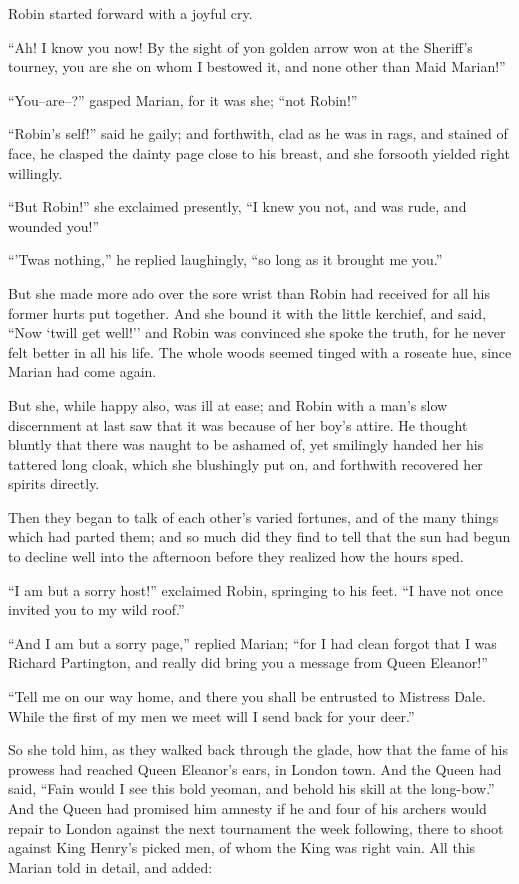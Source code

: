 Robin started forward with a joyful cry.

``Ah! I know you now! By the sight of yon golden arrow won at the
Sheriff's tourney, you are she on whom I bestowed it, and none other
than Maid Marian!''

``You--are--?'' gasped Marian, for it was she; ``not Robin!''

``Robin's self!'' said he gaily; and forthwith, clad as he was in rags,
and stained of face, he clasped the dainty page close to his breast, and
she forsooth yielded right willingly.

``But Robin!'' she exclaimed presently, ``I knew you not, and was rude,
and wounded you!''

``'Twas nothing,'' he replied laughingly, ``so long as it brought me
you.''

But she made more ado over the sore wrist than Robin had received for
all his former hurts put together. And she bound it with the little
kerchief, and said, ``Now `twill get well!'' and Robin was convinced she
spoke the truth, for he never felt better in all his life. The whole
woods seemed tinged with a roseate hue, since Marian had come again.

But she, while happy also, was ill at ease; and Robin with a man's slow
discernment at last saw that it was because of her boy's attire. He
thought bluntly that there was naught to be ashamed of, yet smilingly
handed her his tattered long cloak, which she blushingly put on, and
forthwith recovered her spirits directly.

Then they began to talk of each other's varied fortunes, and of the many
things which had parted them; and so much did they find to tell that the
sun had begun to decline well into the afternoon before they realized
how the hours sped.

``I am but a sorry host!'' exclaimed Robin, springing to his feet. ``I
have not once invited you to my wild roof.''

``And I am but a sorry page,'' replied Marian; ``for I had clean forgot
that I was Richard Partington, and really did bring you a message from
Queen Eleanor!''

``Tell me on our way home, and there you shall be entrusted to Mistress
Dale. While the first of my men we meet will I send back for your
deer.''

So she told him, as they walked back through the glade, how that the
fame of his prowess had reached Queen Eleanor's ears, in London town.
And the Queen had said, ``Fain would I see this bold yeoman, and behold
his skill at the long-bow.'' And the Queen had promised him amnesty if
he and four of his archers would repair to London against the next
tournament the week following, there to shoot against King Henry's
picked men, of whom the King was right vain. All this Marian told in
detail, and added:

